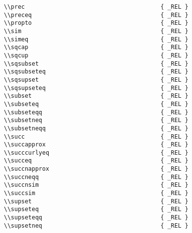 \begin{verbatim}
\\prec                                       { _REL }
\\preceq                                     { _REL }
\\propto                                     { _REL }
\\sim                                        { _REL }
\\simeq                                      { _REL }
\\sqcap                                      { _REL }
\\sqcup                                      { _REL }
\\sqsubset                                   { _REL }
\\sqsubseteq                                 { _REL }
\\sqsupset                                   { _REL }
\\sqsupseteq                                 { _REL }
\\subset                                     { _REL }
\\subseteq                                   { _REL }
\\subseteqq                                  { _REL }
\\subsetneq                                  { _REL }
\\subsetneqq                                 { _REL }
\\succ                                       { _REL }
\\succapprox                                 { _REL }
\\succcurlyeq                                { _REL }
\\succeq                                     { _REL }
\\succnapprox                                { _REL }
\\succneqq                                   { _REL }
\\succnsim                                   { _REL }
\\succsim                                    { _REL }
\\supset                                     { _REL }
\\supseteq                                   { _REL }
\\supseteqq                                  { _REL }
\\supsetneq                                  { _REL }

\end{verbatim}

